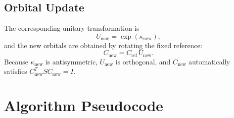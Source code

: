 \documentclass[12pt,a4paper]{article}
\begin{document}
\subsection{Orbital Update}
The corresponding unitary transformation is
\begin{equation}
U_{\text{new}} = \exp(\kappa_{\text{new}}),
\end{equation}
and the new orbitals are obtained by rotating the fixed reference:
\begin{equation}
C_{\text{new}} = C_{\text{ref}} \, U_{\text{new}}.
\end{equation}
Because $\kappa_{\text{new}}$ is antisymmetric, $U_{\text{new}}$ is orthogonal, and $C_{\text{new}}$ automatically satisfies $C_{\text{new}}^T S C_{\text{new}} = I$.

\section{Algorithm Pseudocode}
\end{document}
